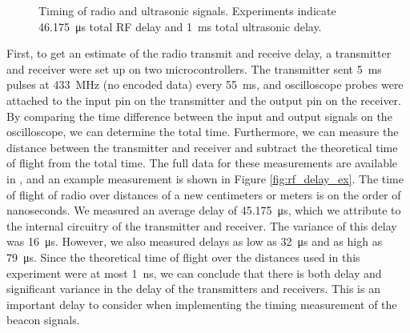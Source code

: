 \documentclass{article}
\newcommand{\Newnameref}[1]{\textit{\nameref{#1}}}
\begin{document}
      \begin{figure}[H]
        \centering
        \caption{Timing of radio and ultrasonic signals. Experiments indicate \SI{46.175}{\micro\second} total RF delay and \SI{1}{\milli\second} total ultrasonic delay.}
        \label{fig:rx_tx_timing}
      \end{figure}


    First, to get an estimate of the radio transmit and receive delay, a transmitter and receiver were set up on two microcontrollers. The transmitter sent \SI{5}{\milli\second} pulses at \SI{433}{\mega\hertz} (no encoded data) every \SI{55}{\milli\second}, and oscilloscope probes were attached to the input pin on the transmitter and the output pin on the receiver. By comparing the time difference between the input and output signals on the oscilloscope, we can determine the total time. Furthermore, we can measure the distance between the transmitter and receiver and subtract the theoretical time of flight from the total time. The full data for these measurements are available in \Newnameref{appendix:rf-rx-tx}, and an example measurement is shown in Figure \ref{fig:rf_delay_ex}. The time of flight of radio over distances of a new centimeters or meters is on the order of nanoseconds. We measured an average delay of \SI{45.175}{\micro\second}, which we attribute to the internal circuitry of the transmitter and receiver. The variance of this delay was \SI{16}{\micro\second}. However, we also measured delays as low as \SI{32}{\micro\second} and as high as \SI{79}{\micro\second}. Since the theoretical time of flight over the distances used in this experiment were at most \SI{1}{\nano\second}, we can conclude that there is both delay and significant variance in the delay of the transmitters and receivers. This is an important delay to consider when implementing the timing measurement of the beacon signals.
\end{document}
